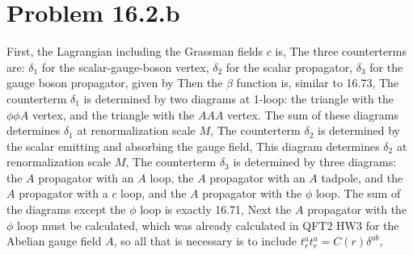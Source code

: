 \documentclass{article}
\begin{document}
\section*{Problem 16.2.b}
First, the Lagrangian  including the Grassman fields $c$ is,
The three counterterms are: $\delta_1$ for the scalar-gauge-boson vertex, $\delta_2$ for the scalar propagator, $\delta_3$ for the gauge boson propagator, given by
Then the $\beta$ function is, similar to 16.73,
The counterterm $\delta_1$ is determined by two diagrams at 1-loop: the triangle with the $\phi\phi A$ vertex, and the triangle with the $AAA$ vertex.
The sum of these diagrams determines $\delta_1$ at renormalization scale $M$,
The counterterm $\delta_2$ is determined by the scalar emitting and absorbing the gauge field,
This diagram determines $\delta_2$ at renormalization scale $M$,
The counterterm $\delta_3$ is determined by three diagrams: the $A$ propagator with an $A$ loop, the $A$ propagator with an $A$ tadpole, and the $A$ propagator with a $c$ loop, and the $A$ propagator with the $\phi$ loop. The sum of the diagrams except the $\phi$ loop is exactly 16.71,
Next the $A$ propagator with the $\phi$ loop must be calculated, which was already calculated in QFT2 HW3 for the Abelian gauge field $A$, so all that is necessary is to include $t_r^a t_r^a=C(r)\delta^{ab}$,
\end{document}
